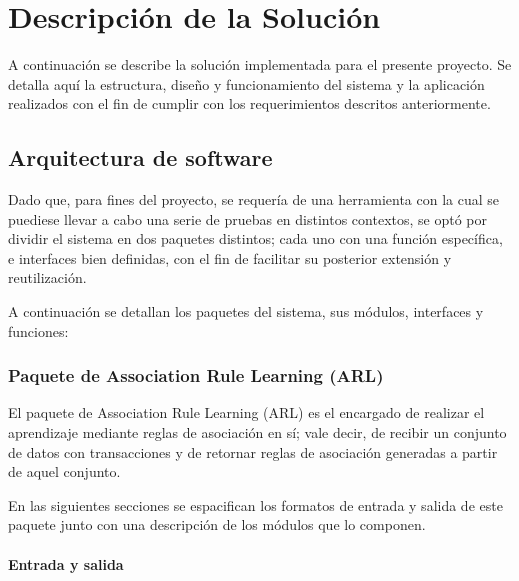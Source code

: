 \chapter{Descripción de la Solución}


A continuación se describe la solución implementada para el presente proyecto. Se detalla aquí la estructura, diseño y funcionamiento del sistema y la aplicación realizados con el fin de cumplir con los requerimientos descritos anteriormente.

\section{Arquitectura de software}

Dado que, para fines del proyecto, se requería de una herramienta con la cual se puediese llevar a cabo una serie de pruebas en distintos contextos, se optó por dividir el sistema en dos paquetes distintos; cada uno con una función específica, e interfaces bien definidas, con el fin de facilitar su posterior extensión y reutilización.


A continuación se detallan los paquetes del sistema, sus módulos, interfaces y funciones:

\subsection{Paquete de Association Rule Learning (ARL)}

El paquete de Association Rule Learning (ARL) es el encargado de realizar el aprendizaje mediante reglas de asociación en sí; vale decir, de recibir un conjunto de datos con transacciones y de retornar reglas de asociación generadas a partir de aquel conjunto.

En las siguientes secciones se espacifican los formatos de entrada y salida de este paquete junto con una descripción de los módulos que lo componen.

\subsubsection{Entrada y salida}

